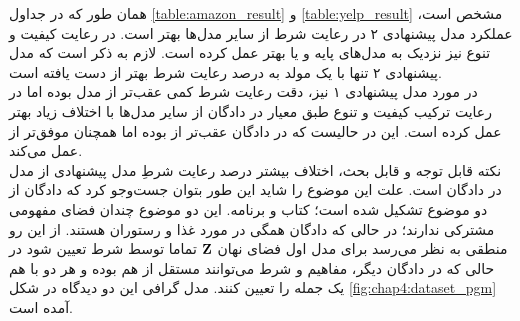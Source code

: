 همان طور که در جداول \ref{table:amazon_result} و \ref{table:yelp_result} مشخص است، عملکرد مدل پیشنهادی ۲ در رعایت شرط از سایر مدل‌ها بهتر است. در رعایت کیفیت و تنوع نیز نزدیک به مدل‌های پایه و یا بهتر عمل کرده است. لازم به ذکر است که مدل پیشنهادی ۲ تنها با یک مولد به درصد رعایت شرط بهتر از \sentigan{} دست یافته است.
\\
در مورد مدل پیشنهادی ۱ نیز، دقت رعایت شرط کمی عقب‌تر از مدل \towardctg{} بوده اما در رعایت ترکیب کیفیت و تنوع طبق معیار \jaccard{} در دادگان \amazon{} از سایر مدل‌ها با اختلاف زیاد بهتر عمل کرده است. این در حالیست که در دادگان \yelp{} عقب‌تر از \towardctg{} بوده اما همچنان موفق‌تر از \sentigan{} عمل می‌کند.
\\
\iffalse
	نکته قابل توجه و قابل بحث، اختلاف بیشتر درصد رعایت شرطِ مدل پیشنهادی از مدل \towardctg{} در دادگان \amazon{} است. علت این موضوع را شاید این طور بتوان جست‌وجو کرد که دادگان \amazon{} از دو موضوع تشکیل شده است؛ کتاب و برنامه. این دو موضوع چندان فضای مفهومی مشترکی ندارند؛ در حالی که دادگان \yelp{} همگی در مورد غذا و رستوران هستند. از این رو منطقی به نظر می‌رسد برای مدل اول فضای نهان ${\bf Z}$ تماما توسط شرط تعیین شود در حالی که در دادگان دیگر، مفاهیم و شرط می‌توانند مستقل از هم بوده و هر دو با هم یک جمله را تعیین کنند. مدل گرافی این دو دیدگاه در شکل \ref{fig:chap4:dataset_pgm} آمده است.
